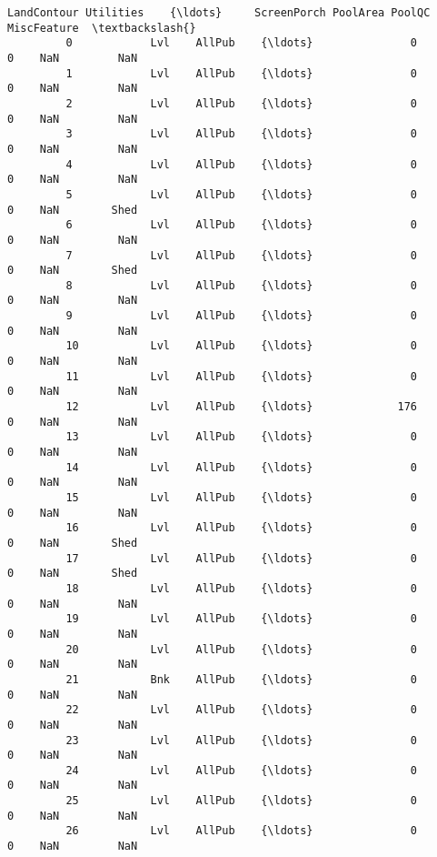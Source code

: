\documentclass[11pt]{article}
\begin{document}
\begin{Verbatim}[commandchars=\\\{\}]
              LandContour Utilities    {\ldots}     ScreenPorch PoolArea PoolQC MiscFeature  \textbackslash{}
         0            Lvl    AllPub    {\ldots}               0        0    NaN         NaN   
         1            Lvl    AllPub    {\ldots}               0        0    NaN         NaN   
         2            Lvl    AllPub    {\ldots}               0        0    NaN         NaN   
         3            Lvl    AllPub    {\ldots}               0        0    NaN         NaN   
         4            Lvl    AllPub    {\ldots}               0        0    NaN         NaN   
         5            Lvl    AllPub    {\ldots}               0        0    NaN        Shed   
         6            Lvl    AllPub    {\ldots}               0        0    NaN         NaN   
         7            Lvl    AllPub    {\ldots}               0        0    NaN        Shed   
         8            Lvl    AllPub    {\ldots}               0        0    NaN         NaN   
         9            Lvl    AllPub    {\ldots}               0        0    NaN         NaN   
         10           Lvl    AllPub    {\ldots}               0        0    NaN         NaN   
         11           Lvl    AllPub    {\ldots}               0        0    NaN         NaN   
         12           Lvl    AllPub    {\ldots}             176        0    NaN         NaN   
         13           Lvl    AllPub    {\ldots}               0        0    NaN         NaN   
         14           Lvl    AllPub    {\ldots}               0        0    NaN         NaN   
         15           Lvl    AllPub    {\ldots}               0        0    NaN         NaN   
         16           Lvl    AllPub    {\ldots}               0        0    NaN        Shed   
         17           Lvl    AllPub    {\ldots}               0        0    NaN        Shed   
         18           Lvl    AllPub    {\ldots}               0        0    NaN         NaN   
         19           Lvl    AllPub    {\ldots}               0        0    NaN         NaN   
         20           Lvl    AllPub    {\ldots}               0        0    NaN         NaN   
         21           Bnk    AllPub    {\ldots}               0        0    NaN         NaN   
         22           Lvl    AllPub    {\ldots}               0        0    NaN         NaN   
         23           Lvl    AllPub    {\ldots}               0        0    NaN         NaN   
         24           Lvl    AllPub    {\ldots}               0        0    NaN         NaN   
         25           Lvl    AllPub    {\ldots}               0        0    NaN         NaN   
         26           Lvl    AllPub    {\ldots}               0        0    NaN         NaN   

\end{Verbatim}
\end{document}
